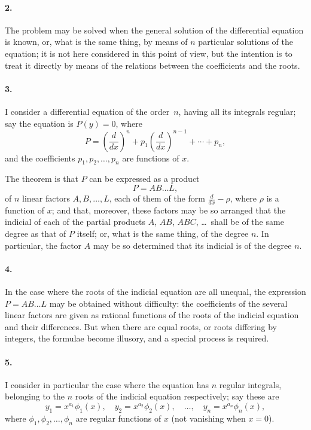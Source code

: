 \documentclass[11pt,a4paper]{article}
\theoremstyle{definition}
\begin{document}
\paragraph{2.} The problem may be solved when the general solution of the differential equation is known, or, what is the same thing, by means of $n$ particular solutions of the equation; it is not here considered in this point of view, but the intention is to treat it directly by means of the relations between the coefficients and the roots.

\paragraph{3.} I consider a differential equation of the order~$n$, having all its integrals regular; say the equation is $P(y) = 0$, where
\[
P = \left(\frac{d}{dx}\right)^{n} + p_{1}\left(\frac{d}{dx}\right)^{n-1} + \cdots + p_{n},
\]
and the coefficients $p_{1}, p_{2}, \ldots, p_{n}$ are functions of $x$.

\newpage

The theorem is that $P$ can be expressed as a product
\[
P = AB\ldots L,
\]
of $n$ linear factors $A, B, \ldots, L$, each of them of the form $\frac{d}{dx} - \rho$, where $\rho$ is a function of $x$; and that, moreover, these factors may be so arranged that the indicial of each of the partial products $A$, $AB$, $ABC$, \ldots\ shall be of the same degree as that of $P$ itself; or, what is the same thing, of the degree $n$. In particular, the factor $A$ may be so determined that its indicial is of the degree $n$.

\paragraph{4.} In the case where the roots of the indicial equation are all unequal, the expression $P = AB\ldots L$ may be obtained without difficulty: the coefficients of the several linear factors are given as rational functions of the roots of the indicial equation and their differences. But when there are equal roots, or roots differing by integers, the formulae become illusory, and a special process is required.

\paragraph{5.} I consider in particular the case where the equation has $n$ regular integrals, belonging to the $n$ roots of the indicial equation respectively; say these are
\[
y_{1} = x^{a_{1}}\phi_{1}(x), \quad y_{2} = x^{a_{2}}\phi_{2}(x), \quad \ldots, \quad y_{n} = x^{a_{n}}\phi_{n}(x),
\]
where $\phi_{1}, \phi_{2}, \ldots, \phi_{n}$ are regular functions of $x$ (not vanishing when $x=0$).
\end{document}
